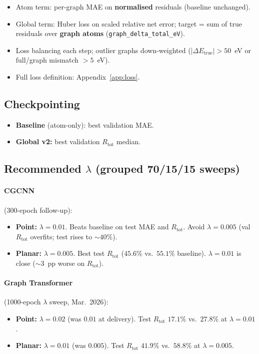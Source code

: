 \documentclass[11pt,a4paper]{article}
\newcommand{\dEtrue}{\Delta E_{\mathrm{true}}}
\begin{document}
\begin{itemize}
  \item Atom term: per-graph MAE on \textbf{normalised} residuals (baseline unchanged).
  \item Global term: Huber loss on scaled relative net error; target = sum of true residuals over \textbf{graph atoms} (\texttt{graph\_delta\_total\_eV}).
  \item Loss balancing each step; outlier graphs down-weighted ($|\dEtrue|>50$~eV or full/graph mismatch $>5$~eV).
  \item Full loss definition: Appendix~\ref{app:loss}.
\end{itemize}

\subsection*{Checkpointing}

\begin{itemize}
  \item \textbf{Baseline} (atom-only): best validation MAE.
  \item \textbf{Global v2:} best validation $R_{\mathrm{tot}}$ median.
\end{itemize}

\subsection*{Recommended $\lambda$ (grouped 70/15/15 sweeps)}

\paragraph{CGCNN} (300-epoch follow-up):
\begin{itemize}
  \item \textbf{Point:} $\lambda=0.01$. Beats baseline on test MAE and $R_{\mathrm{tot}}$. Avoid $\lambda=0.005$ (val $R_{\mathrm{tot}}$ overfits; test rises to ${\sim}40\%$).
  \item \textbf{Planar:} $\lambda=0.005$. Best test $R_{\mathrm{tot}}$ ($45.6\%$ vs.\ $55.1\%$ baseline). $\lambda=0.01$ is close (${\sim}3$~pp worse on $R_{\mathrm{tot}}$).
\end{itemize}

\paragraph{Graph Transformer} (1000-epoch $\lambda$ sweep, Mar.~2026):
\begin{itemize}
  \item \textbf{Point:} $\lambda=0.02$ (was $0.01$ at delivery). Test $R_{\mathrm{tot}}$ $17.1\%$ vs.\ $27.8\%$ at $\lambda=0.01$.
  \item \textbf{Planar:} $\lambda=0.01$ (was $0.005$). Test $R_{\mathrm{tot}}$ $41.9\%$ vs.\ $58.8\%$ at $\lambda=0.005$.
\end{itemize}
\end{document}
